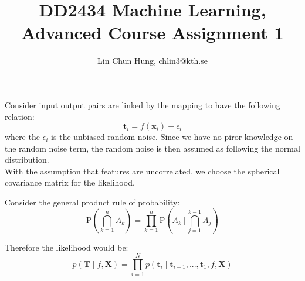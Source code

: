 \documentclass[12pt]{article}
\newenvironment{question}[2][Question]{\begin{trivlist}
\kern10pt
\item[\hskip \labelsep {\bfseries #1}\hskip \labelsep {\bfseries #2.}]}{\end{trivlist}}
\begin{document}
 
 
 
\title{DD2434 Machine Learning, Advanced Course Assignment 1}
\author{Lin Chun Hung, chlin3@kth.se} 
 
\maketitle

\begin{question}{1}
Consider input output pairs are linked by the mapping to have the following
 relation:
\begin{equation}
    \boldsymbol{t}_i = f(\boldsymbol{x}_i) + \epsilon_i
\end{equation}
where the $\epsilon_i$ is the unbiased random noise. Since we have no piror knowledge
on the random noise term, the random noise is then assumed as following the normal
distribution. \\

With the assumption that features are uncorrelated, we choose the spherical
covariance matrix for the likelihood.
\end{question} %

\begin{question}{2}
Consider the general product rule of probability:
$$\mathrm {P} \left(\bigcap _{k=1}^{n}A_{k}\right)=
  \prod _{k=1}^{n}\mathrm {P} \left(A_{k}\,{\Bigg |}\,\bigcap _{j=1}^{k-1}A_{j}\right)$$

Therefore the likelihood would be:
\begin{equation}
  p(\boldsymbol{T}\mid f,\boldsymbol{X}) =
  \prod _{i=1}^{N}p(\boldsymbol{t}_i \mid \boldsymbol{t}_{i-1},...,\boldsymbol{t}_{1},
  f,\boldsymbol{X})
\end{equation}

\end{question} %

 
\end{document}
